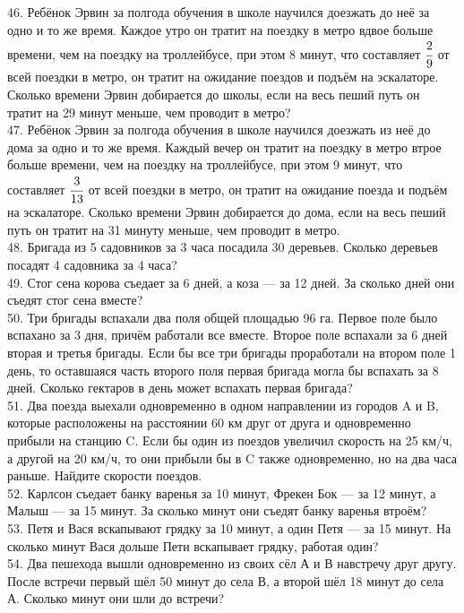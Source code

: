 46. Ребёнок Эрвин за полгода обучения в школе научился доезжать до неё за одно и то же время. Каждое утро он тратит на поездку в метро вдвое больше времени, чем на поездку на троллейбусе, при этом 8 минут, что составляет $\cfrac{2}{9}$ от всей поездки в метро, он тратит на ожидание поездов и подъём на эскалаторе. Сколько времени Эрвин добирается до школы, если на весь пеший путь он тратит на 29 минут меньше, чем проводит в метро?\\
47. Ребёнок Эрвин за полгода обучения в школе научился доезжать из неё до дома за одно и то же время. Каждый вечер он тратит на поездку в метро втрое больше времени, чем на поездку на троллейбусе, при этом 9 минут, что составляет $\cfrac{3}{13}$ от всей поездки в метро, он тратит на ожидание поезда и подъём на эскалаторе. Сколько времени Эрвин добирается до дома, если на весь пеший путь он тратит на 31 минуту меньше, чем проводит в метро.\\
48. Бригада из 5 садовников за 3 часа посадила 30 деревьев. Сколько деревьев посадят 4 садовника за 4 часа?\\
49. Стог сена корова съедает за 6 дней, а коза --- за 12 дней. За сколько дней они съедят стог сена вместе?\\
50. Три бригады вспахали два поля общей площадью 96 га. Первое поле было вспахано за 3 дня, причём работали все вместе. Второе поле вспахали за 6 дней вторая и третья бригады. Если бы все три бригады проработали на втором поле 1 день, то оставшаяся часть второго поля первая бригада могла бы вспахать за 8 дней. Сколько гектаров в день может вспахать первая бригада?\\
51. Два поезда выехали одновременно в одном направлении из городов A и B, которые расположены на расстоянии 60 км друг от друга и одновременно прибыли на станцию C. Если бы один из поездов увеличил скорость на 25 км/ч, а другой на 20 км/ч, то они прибыли бы в C также одновременно, но на два часа раньше. Найдите скорости поездов.\\
52. Карлсон съедает банку варенья за 10 минут, Фрекен Бок --- за 12 минут, а Малыш --- за 15 минут. За сколько минут они съедят банку варенья втроём?\\
53. Петя и Вася вскапывают грядку за 10 минут, а один Петя --- за 15 минут. На сколько минут Вася дольше Пети вскапывает грядку, работая один?\\
54. Два пешехода вышли одновременно из своих сёл А и В навстречу друг другу. После встречи первый шёл 50 минут до села В, а второй шёл 18 минут до села А. Сколько минут они шли до встречи?\\
